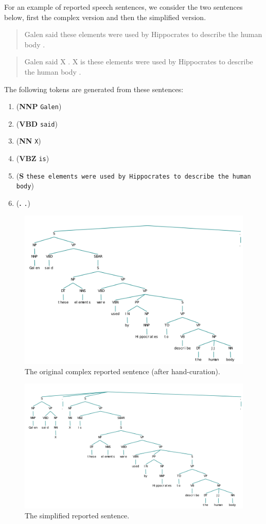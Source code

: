 \documentclass{article}
\begin{document}
For an example of reported speech sentences, we consider the two sentences below, first the complex version and then the simplified version.

\begin{quote}
Galen said these elements were used by Hippocrates to describe the human body .
\end{quote}

\begin{quote}
Galen said X . X is these elements were used by Hippocrates to describe the human body .
\end{quote}

The following tokens are generated from these sentences:

\begin{enumerate}
\item (\textbf{NNP} \texttt{Galen})
\item (\textbf{VBD} \texttt{said})
\item (\textbf{NN} \texttt{X})
\item (\textbf{VBZ} \texttt{is})
\item (\textbf{S} \texttt{these elements were used by Hippocrates to describe the human body})
\item (\textbf{.} \texttt{.})
\end{enumerate}

\begin{figure}
\includegraphics[scale=.6]{comp_quot}
\caption{The original complex reported sentence (after hand-curation).}
\end{figure}

\begin{figure}
\includegraphics[scale=.56]{simp_quot}
\caption{The simplified reported sentence.}
\end{figure}
\end{document}
